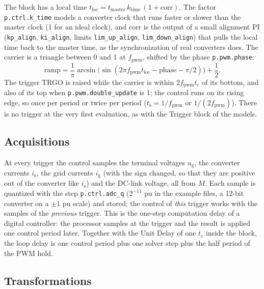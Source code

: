 \documentclass[11pt,a4paper]{scrartcl}
\newcommand{\ped}[1]{_{\mathrm{#1}}}
\newcommand{\code}[1]{\texttt{#1}}
\begin{document}
\begin{onehalfspace}
The block has a local time $t\ped{loc} = t\ped{master}\, k\ped{time}\, (1 + \mathrm{corr})$. The factor \code{p.ctrl.k\_time} models a converter clock that runs faster or slower than the master clock (1 for an ideal clock), and $\mathrm{corr}$ is the output of a small alignment PI (\code{kp\_align}, \code{ki\_align}, limits \code{lim\_up\_align}, \code{lim\_down\_align}) that pulls the local time back to the master time, as the synchronization of real converters does. The carrier is a triangle between 0 and 1 at $f\ped{pwm}$, shifted by the phase \code{p.pwm.phase}:
\begin{equation}
	\mathrm{ramp} = \frac{1}{\pi} \arcsin\!\big(\sin(2\pi f\ped{pwm} t\ped{loc} - \mathrm{phase} - \pi/2)\big) + \frac{1}{2}.
	\label{eq:ramp}
\end{equation}
The trigger TRGO is raised while the carrier is within $2 f\ped{pwm} t\ped{c}$ of its bottom, and also of its top when \code{p.pwm.double\_update} is 1; the control runs on its rising edge, so once per period or twice per period ($t\ped{s} = 1/f\ped{pwm}$ or $1/(2 f\ped{pwm})$). There is no trigger at the very first evaluation, as with the Trigger block of the models.

\subsection{Acquisitions}
\label{sec:acq}

At every trigger the control samples the terminal voltages $u\ped{g}$, the converter currents $i\ped{s}$, the grid currents $i\ped{g}$ (with the sign changed, so that they are positive out of the converter like $i\ped{s}$) and the DC-link voltage, all from $M$. Each sample is quantized with the step \code{p.ctrl.adc\_q} ($2^{-11}$ pu in the example files, a 12-bit converter on a $\pm 1$ pu scale) and stored; the control of \emph{this} trigger works with the samples of the \emph{previous} trigger. This is the one-step computation delay of a digital controller: the processor samples at the trigger and the result is applied one control period later. Together with the Unit Delay of one $t\ped{c}$ inside the block, the loop delay is one control period plus one solver step plus the half period of the PWM hold.

\subsection{Transformations}
\label{sec:transforms}


\end{onehalfspace}
\end{document}

